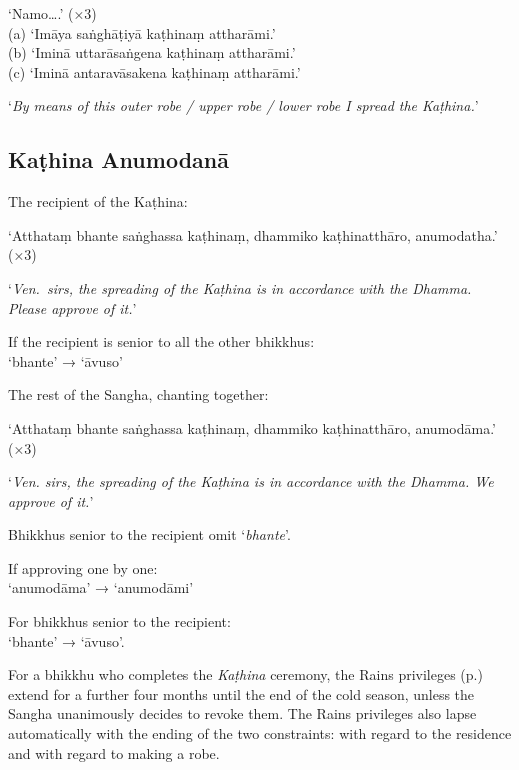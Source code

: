 ‘Namo….’ (×3)\\
(a) ‘Imāya saṅghāṭiyā kaṭhinaṃ attharāmi.’\\
(b) ‘Iminā uttarāsaṅgena kaṭhinaṃ attharāmi.’\\
(c) ‘Iminā antaravāsakena kaṭhinaṃ attharāmi.’

‘\emph{By means of this outer robe / upper robe / lower robe I spread the Kaṭhina.}’


\subsection{Kaṭhina Anumodanā}
\label{kathina-anumodana}

The recipient of the Kaṭhina:

‘Atthataṃ bhante saṅghassa kaṭhinaṃ, dhammiko kaṭhinatthāro, anumodatha.’ (×3)

‘\emph{Ven.\ sirs, the spreading of the Kaṭhina is in accordance with the Dhamma.
  Please approve of it.}’

If the recipient is senior to all the other bhikkhus:\\
‘bhante’ → ‘āvuso’

The rest of the Sangha, chanting together:

‘Atthataṃ bhante saṅghassa kaṭhinaṃ, dhammiko kaṭhinatthāro, anumodāma.’ (×3)

‘\emph{Ven. sirs, the spreading of the Kaṭhina is in accordance with the Dhamma.
  We approve of it.}’


Bhikkhus senior to the recipient omit ‘\emph{bhante}’.

If approving one by one:\\
‘anumodāma’ → ‘anumodāmi’

For bhikkhus senior to the recipient:\\
‘bhante’ → ‘āvuso’.

For a bhikkhu who completes the \emph{Kaṭhina} ceremony, the Rains privileges
(p.\pageref{rains-privileges}) extend for a further four months until the end of
the cold season, unless the Sangha unanimously decides to revoke them. The Rains
privileges also lapse automatically with the ending of the two constraints: with
regard to the residence and with regard to making a robe.


